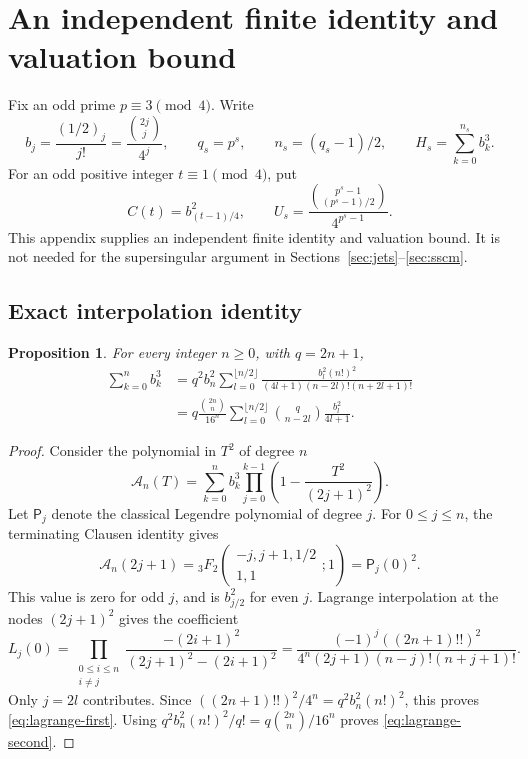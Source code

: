 \documentclass[11pt,a4paper]{article}
\newtheorem{proposition}[theorem]{Proposition}
\begin{document}
\appendix
\section{An independent finite identity and valuation bound}\label{app:finite}

Fix an odd prime $p\equiv3\pmod4$.  Write
\[
 b_j=\frac{(1/2)_j}{j!}=\frac{\binom{2j}{j}}{4^j},\qquad
 q_s=p^s,\qquad n_s=(q_s-1)/2,\qquad
 H_s=\sum_{k=0}^{n_s}b_k^3.
\]
For an odd positive integer $t\equiv1\pmod4$, put
\[
 C(t)=b_{(t-1)/4}^2,
 \qquad U_s=\frac{\binom{p^s-1}{(p^s-1)/2}}{4^{p^s-1}}.
\]
This appendix supplies an independent finite identity and valuation
bound. It is not needed for the supersingular argument in
Sections~\ref{sec:jets}--\ref{sec:sscm}.

\subsection{Exact interpolation identity}

\begin{proposition}\label{prop:finite-lagrange}
For every integer $n\ge0$, with $q=2n+1$,
\begin{align}
 \sum_{k=0}^n b_k^3
 &=q^2b_n^2\sum_{l=0}^{\lfloor n/2\rfloor}
 \frac{b_l^2(n!)^2}{(4l+1)(n-2l)!(n+2l+1)!} \label{eq:lagrange-first}\\
 &=q\frac{\binom{2n}{n}}{16^n}
 \sum_{l=0}^{\lfloor n/2\rfloor}
 \binom{q}{n-2l}\frac{b_l^2}{4l+1}. \label{eq:lagrange-second}
\end{align}
\end{proposition}
\begin{proof}
Consider the polynomial in $T^2$ of degree $n$
\[
 \mathcal A_n(T)=\sum_{k=0}^n b_k^3
       \prod_{j=0}^{k-1}\left(1-\frac{T^2}{(2j+1)^2}\right).
\]
Let $\mathsf P_j$ denote the classical Legendre polynomial of degree $j$.
For $0\le j\le n$, the terminating Clausen identity gives
\[
 \mathcal A_n(2j+1)
 ={}_3F_2\!\left(\begin{matrix}-j,j+1,1/2\\1,1\end{matrix};1\right)
 =\mathsf P_j(0)^2.
\]
This value is zero for odd $j$, and is $b_{j/2}^2$ for even $j$.
Lagrange interpolation at the nodes $(2j+1)^2$ gives the coefficient
\[
 L_j(0)=\prod_{\substack{0\le i\le n\\i\ne j}}
 \frac{-(2i+1)^2}{(2j+1)^2-(2i+1)^2}
 =\frac{(-1)^j((2n+1)!!)^2}
 {4^n(2j+1)(n-j)!(n+j+1)!}.
\]
Only $j=2l$ contributes.  Since
$((2n+1)!!)^2/4^n=q^2b_n^2(n!)^2$, this proves
\eqref{eq:lagrange-first}.  Using
$q^2b_n^2(n!)^2/q!=q\binom{2n}{n}/16^n$ proves
\eqref{eq:lagrange-second}.
\end{proof}
\end{document}
